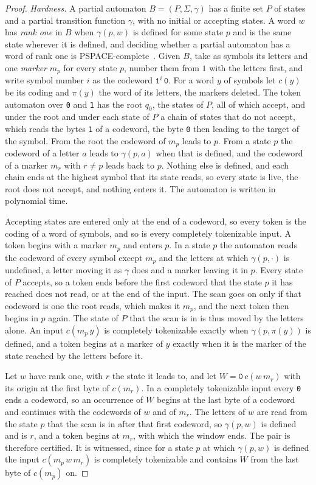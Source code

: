 \documentclass[11pt,a4paper]{article}
\theoremstyle{definition}
\theoremstyle{plain}
\newcommand{\code}[1]{\texttt{#1}}
\begin{document}
\begin{proof}
\emph{Hardness.} A partial automaton $B = (P, \Sigma, \gamma)$ has a finite set $P$ of states and a partial transition
function $\gamma$, with no initial or accepting states. A word $w$ has \emph{rank one} in $B$ when $\gamma(p, w)$ is
defined for some state $p$ and is the same state wherever it is defined, and deciding whether a partial automaton has a
word of rank one is PSPACE-complete~\cite[Theorem~1, p.~2]{ryzhikov2019birecurrent}. Given $B$, take as symbols its
letters and one \emph{marker} $m_p$ for every state $p$, number them from $1$ with the letters first, and write symbol
number $i$ as the codeword $\code{1}^i\, \code{0}$. For a word $y$ of symbols let $c(y)$ be its coding and $\pi(y)$ the
word of its letters, the markers deleted. The token automaton over \code{0} and \code{1} has the root $q_0$, the states
of $P$, all of which accept, and under the root and under each state of $P$ a chain of states that do not accept, which
reads the bytes \code{1} of a codeword, the byte \code{0} then leading to the target of the symbol. From the root the
codeword of $m_p$ leads to $p$. From a state $p$ the codeword of a letter $a$ leads to $\gamma(p, a)$ when that is
defined, and the codeword of a marker $m_r$ with $r \neq p$ leads back to $p$. Nothing else is defined, and each chain
ends at the highest symbol that its state reads, so every state is live, the root does not accept, and nothing enters
it. The automaton is written in polynomial time.

Accepting states are entered only at the end of a codeword, so every token is the coding of a word of symbols, and so is
every completely tokenizable input. A token begins with a marker $m_p$ and enters $p$. In a state $p$ the automaton
reads the codeword of every symbol except $m_p$ and the letters at which $\gamma(p, \cdot)$ is undefined, a letter
moving it as $\gamma$ does and a marker leaving it in $p$. Every state of $P$ accepts, so a token ends before the first
codeword that the state $p$ it has reached does not read, or at the end of the input. The scan goes on only if that
codeword is one the root reads, which makes it $m_p$, and the next token then begins in $p$ again. The state of $P$ that
the scan is in is thus moved by the letters alone. An input $c(m_p\, y)$ is completely tokenizable exactly when
$\gamma(p, \pi(y))$ is defined, and a token begins at a marker of $y$ exactly when it is the marker of the state reached
by the letters before it.

Let $w$ have rank one, with $r$ the state it leads to, and let $W = \code{0}\, c(w\, m_r)$ with its origin at the first
byte of $c(m_r)$. In a completely tokenizable input every \code{0} ends a codeword, so an occurrence of $W$ begins at
the last byte of a codeword and continues with the codewords of $w$ and of $m_r$. The letters of $w$ are read from the
state $p$ that the scan is in after that first codeword, so $\gamma(p, w)$ is defined and is $r$, and a token begins at
$m_r$, with which the window ends. The pair is therefore certified. It is witnessed, since for a state $p$ at which
$\gamma(p, w)$ is defined the input $c(m_p\, w\, m_r)$ is completely tokenizable and contains $W$ from the last byte of
$c(m_p)$ on.


\end{proof}
\end{document}
